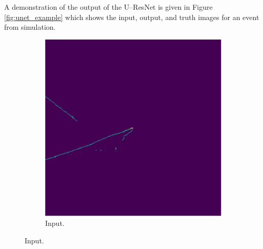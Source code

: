 A demonstration of the output of the U--ResNet is given in Figure
\ref{fig:unet_example} which shows the input, output, and truth images for an
event from \protodune{} simulation.
\begin{figure}
	\centering

	\begin{subfigure}[b]{0.5\textwidth}
		\centering
		\includegraphics[width=\textwidth]{figures/unet_example_in.pdf}
		\caption {Input.}
		\label{fig:unet_example_in}
	\end{subfigure}


\end{figure}
